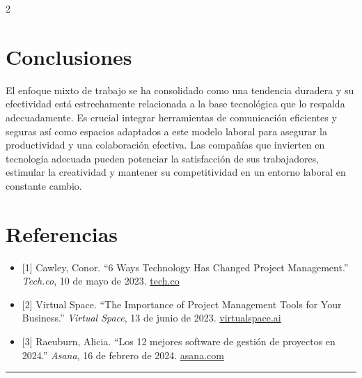 \documentclass[12pt,spanish,Letterpaper,openany]{book}
\newcommand{\HRule}{\begin{center}\rule{0.5\linewidth}{0.2mm}\end{center}}
\begin{document}
\begin {multicols}{2}
\hypertarget{conclusiones-16}{%
\section{Conclusiones}\label{conclusiones-16}}

El enfoque mixto de trabajo se ha consolidado como una tendencia duradera y su
efectividad está estrechamente relacionada a la base tecnológica que lo respalda
adecuadamente. Es crucial integrar herramientas de comunicación eficientes y seguras así
como espacios adaptados a este modelo laboral para asegurar la productividad y una
colaboración efectiva. Las compañías que invierten en tecnología adecuada pueden potenciar
la satisfacción de sus trabajadores, estimular la creatividad y mantener su competitividad en
un entorno laboral en constante cambio.

\hypertarget{referencias-16}{%
\section{Referencias}\label{referencias-16}}

\begin{itemize}
\item
  {[}1{]} Cawley, Conor. ``6 Ways Technology Has Changed Project Management.'' \emph{Tech.co}, 10 de mayo de 2023. \href{https://tech.co}{tech.co}
\item
  {[}2{]} Virtual Space. ``The Importance of Project Management Tools for Your Business.'' \emph{Virtual Space}, 13 de junio de 2023. \href{https://virtualspace.ai}{virtualspace.ai}
\item
  {[}3{]} Raeuburn, Alicia. ``Los 12 mejores software de gestión de proyectos en 2024.'' \emph{Asana}, 16 de febrero de 2024. \href{https://asana.com}{asana.com}
\end{itemize}

\end {multicols}

\medskip

\HRule

\medskip




\end{document}
